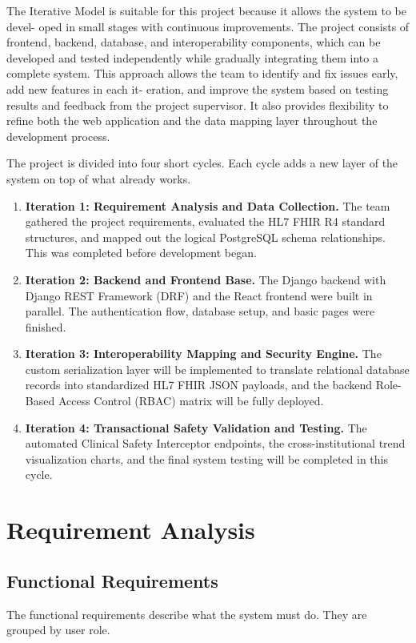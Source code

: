 \documentclass[12pt, a4paper]{report}
\numberwithin{equation}{chapter}
\begin{document}
The Iterative Model is suitable for this project because it allows the system to be devel-
oped in small stages with continuous improvements. The project consists of frontend,
backend, database, and interoperability components, which can be developed and
tested independently while gradually integrating them into a complete system. This
approach allows the team to identify and fix issues early, add new features in each it-
eration, and improve the system based on testing results and feedback from the project
supervisor. It also provides flexibility to refine both the web application and the data mapping
layer throughout the development process.

The project is divided into four short cycles. Each cycle adds a new layer of the system
on top of what already works.
\begin{enumerate}[label=\Roman*.]
    \item \textbf{Iteration 1: Requirement Analysis and Data Collection.} The team gathered
    the project requirements, evaluated the HL7 FHIR R4 standard structures, and mapped out 
    the logical PostgreSQL schema relationships. This was completed before development began.
    \item \textbf{Iteration 2: Backend and Frontend Base.} The Django backend with Django REST 
    Framework (DRF) and the React frontend were built in parallel. The authentication flow, 
    database setup, and basic pages were finished.
    \item \textbf{Iteration 3: Interoperability Mapping and Security Engine.} The custom serialization 
    layer will be implemented to translate relational database records into standardized HL7 FHIR 
    JSON payloads, and the backend Role-Based Access Control (RBAC) matrix will be fully deployed.
    \item \textbf{Iteration 4: Transactional Safety Validation and Testing.} The automated Clinical 
    Safety Interceptor endpoints, the cross-institutional trend visualization charts, and the final 
    system testing will be completed in this cycle.
\end{enumerate}

\section{Requirement Analysis}

\subsection{Functional Requirements}
The functional requirements describe what the system must do. They are grouped by user role.
\end{document}
